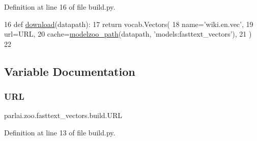 Definition at line 16 of file build.\+py.


\begin{DoxyCode}
16 \textcolor{keyword}{def }\hyperlink{namespaceparlai_1_1zoo_1_1pretrained__transformers_1_1build_afaead0deab400e1c516706e85dd4ed9b}{download}(datapath):
17     \textcolor{keywordflow}{return} vocab.Vectors(
18         name=\textcolor{stringliteral}{'wiki.en.vec'},
19         url=URL,
20         cache=\hyperlink{namespaceparlai_1_1agents_1_1legacy__agents_1_1seq2seq_1_1utils__v0_a5fbd3301b67f00d6d146fb01c7cd7626}{modelzoo\_path}(datapath, \textcolor{stringliteral}{'models:fasttext\_vectors'}),
21     )
22 \end{DoxyCode}


\subsection{Variable Documentation}
\mbox{\label{namespaceparlai_1_1zoo_1_1fasttext__vectors_1_1build_a812e1e5e7e7dda31c2598cdf877c82ca}} 
\subsubsection{\texorpdfstring{U\+RL}{URL}}
{\footnotesize\ttfamily parlai.\+zoo.\+fasttext\+\_\+vectors.\+build.\+U\+RL}



Definition at line 13 of file build.\+py.

